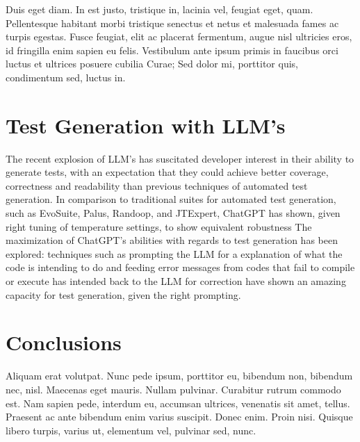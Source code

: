 Duis eget diam. In est justo, tristique in, lacinia vel, feugiat eget,
quam. Pellentesque habitant morbi tristique senectus et netus et
malesuada fames ac turpis egestas. Fusce feugiat, elit ac placerat
fermentum, augue nisl ultricies eros, id fringilla enim sapien eu
felis. Vestibulum ante ipsum primis in faucibus orci luctus et
ultrices posuere cubilia Curae; Sed dolor mi, porttitor quis,
condimentum sed, luctus in. 

\section{Test Generation with LLM's}

The recent explosion of LLM's has suscitated developer interest in their ability to generate tests, with an expectation that they could achieve better coverage, correctness and readability than previous techniques of automated test generation. \cite{kn:junjiewang}
In comparison to traditional suites for automated test generation, such as EvoSuite, Palus, Randoop, and JTExpert, ChatGPT has shown, given right tuning of temperature settings, to show equivalent robustness \cite{kn:gptunitbra}
The maximization of ChatGPT's abilities with regards to test generation has been explored: techniques such as prompting the LLM for a explanation of what the code is intending to do \cite{kn:nuances} and feeding error messages from codes that fail to compile or execute has intended back to the LLM for correction \cite{kn:chattester} have shown an amazing capacity for test generation, given the right prompting.


\section{Conclusions}

Aliquam erat volutpat. Nunc pede ipsum, porttitor eu, bibendum non,
bibendum nec, nisl. Maecenas eget mauris. Nullam pulvinar. Curabitur
rutrum commodo est. Nam sapien pede, interdum eu, accumsan ultrices,
venenatis sit amet, tellus. Praesent ac ante bibendum enim varius
suscipit. Donec enim. Proin nisi. Quisque libero turpis, varius ut,
elementum vel, pulvinar sed, nunc. 

